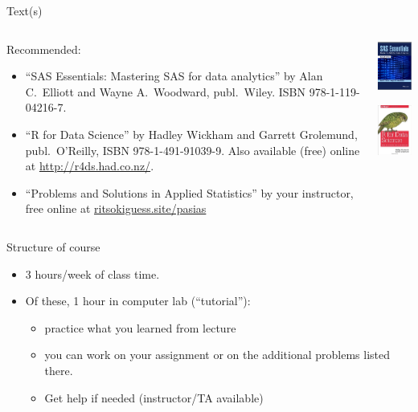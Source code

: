 \documentclass[ignorenonframetext,]{beamer}
\providecommand{\tightlist}{%
  \setlength{\itemsep}{0pt}\setlength{\parskip}{0pt}}
\begin{document}
\begin{frame}{Text(s)}
\protect\hypertarget{texts}{}

\begin{columns}
    \begin{column}{0.7\textwidth}
Recommended:
  \begin{itemize}
\item ``SAS Essentials: Mastering SAS for data analytics'' by Alan C.\
  Elliott and Wayne A.\ Woodward, publ.\ Wiley. ISBN 978-1-119-04216-7.
\item ``R for Data Science'' by Hadley Wickham and Garrett Grolemund,
  publ.\ O'Reilly, ISBN 978-1-491-91039-9. Also available (free)
  online at \url{http://r4ds.had.co.nz/}.
  \item ``Problems and Solutions in Applied Statistics'' by your instructor, free online at \url{ritsokiguess.site/pasias}
\end{itemize}
    \end{column}
    \begin{column}{0.3\textwidth}
      \includegraphics[width=1in]{Screenshot_2018-08-17_12-24-26.png}

      \includegraphics[width=1in]{r4ds}
    \end{column}
  \end{columns}

\end{frame}

\begin{frame}{Structure of course}
\protect\hypertarget{structure-of-course}{}

\begin{itemize}
\tightlist
\item
  3 hours/week of class time.
\item
  Of these, 1 hour in computer lab (``tutorial''):

  \begin{itemize}
  \tightlist
  \item
    practice what you learned from lecture
  \item
    you can work on your assignment or on the additional problems listed
    there.
  \item
    Get help if needed (instructor/TA available)
  \end{itemize}
\end{itemize}

\end{frame}
\end{document}
